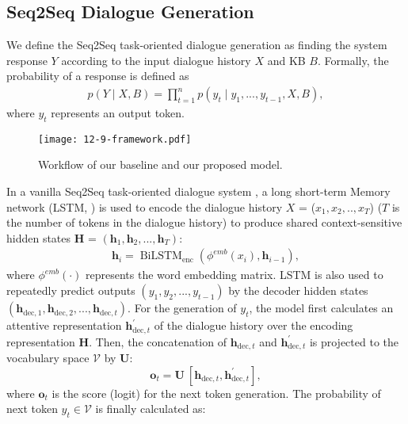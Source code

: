 \documentclass[11pt,a4paper]{article}
\begin{document}
\subsection{Seq2Seq Dialogue Generation} \label{sec:seq2seq}
We define the Seq2Seq task-oriented dialogue generation
as finding the system response ${Y}$
according to the input dialogue history $X$ and KB $B$.
Formally, the probability of a response is defined as
\begin{eqnarray}
p({Y} \mid X, B) = \prod_{t=1}^{n}  p (y_t \mid  y_1, ..., y_{t - 1}, X, B),
\end{eqnarray}
where $y_t$ represents an output token.
\begin{figure}[t]
	\centering
\texttt{[image: 12-9-framework.pdf]}
	\caption{
		Workflow of our baseline and our proposed model.
	}
	\label{fig:framework}
\end{figure}
In a vanilla Seq2Seq task-oriented dialogue system \cite{eric-manning-2017-copy}, a long short-term Memory network (LSTM, )  is used to encode the dialogue history
$X$ = (${x}_{1}, {x}_{2},.., {x}_{T}$)  ($T$ is the 
number of tokens in the dialogue history) to produce shared context-sensitive  hidden states $\boldsymbol{H}$ =  $(\boldsymbol{h}_{1}, \boldsymbol{h}_2, ..., \boldsymbol{h}_{T})$:
\begin{eqnarray}
	\boldsymbol{h}_{i}=\operatorname{BiLSTM}_\text{enc}\left(\phi^{emb}(x_{i}), \boldsymbol{h}_{i-1}\right),
\end{eqnarray}
where $\phi^{emb}(\cdot)$ represents the word embedding matrix. LSTM is also used to repeatedly predict outputs $(y_{1}, y_2, ... ,y_{t-1})$ by the decoder hidden states $({\boldsymbol{h}}_{\text{dec}, 1}, {\boldsymbol{h}}_{\text{dec}, 2}, ... ,{\boldsymbol{h}}_{\text{dec}, t})$.
For the generation of $y_t$, the model
first calculates an attentive representation ${\boldsymbol{h}}^{'}_{\text{dec}, t}$ of the dialogue history over the encoding representation $\boldsymbol{H}$.
Then, the concatenation of  ${\boldsymbol{h}}_{\text{dec}, t}$
and  ${\boldsymbol{h}}^{'}_{\text{dec}, t}$
is projected to the vocabulary space $\mathcal{V}$ by $\boldsymbol{U}$:
\begin{equation}
\label{vanilla}
	\boldsymbol{o}_t = \boldsymbol{U}\ [{\boldsymbol{h}}^{}_{\text{dec}, t}, {\boldsymbol{h}}^{'}_{\text{dec}, t}], 
\end{equation}
where $\boldsymbol{o}_t$ is the score (logit) for the next token generation.
The probability of next token $y_t \in \mathcal{V}$ is finally calculated as:
\end{document}
